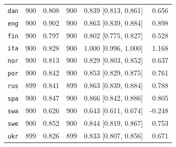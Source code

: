 \begin{table}[htbp]
\begin{minipage}[t]{0.485\linewidth}
{\begin{tabular}{@{}lrrrrr@{}}
\texttt{dan} & 900 & 0.808 & 900 & 0.839 [0.813, 0.861] & 0.656 \\
\texttt{eng} & 900 & 0.902 & 900 & 0.863 [0.839, 0.884] & 0.898 \\
\texttt{fin} & 900 & 0.797 & 900 & 0.802 [0.775, 0.827] & 0.528 \\
\texttt{ita} & 900 & 0.828 & 900 & 1.000 [0.996, 1.000] & 1.168 \\
\texttt{nor} & 900 & 0.813 & 900 & 0.829 [0.803, 0.852] & 0.637 \\
\texttt{por} & 900 & 0.842 & 900 & 0.853 [0.829, 0.875] & 0.761 \\
\texttt{rus} & 899 & 0.841 & 899 & 0.863 [0.839, 0.884] & 0.788 \\
\texttt{spa} & 900 & 0.847 & 900 & 0.866 [0.842, 0.886] & 0.805 \\
\texttt{swa} & 900 & 0.626 & 900 & 0.643 [0.611, 0.674] & -0.248 \\
\texttt{swe} & 900 & 0.852 & 900 & 0.844 [0.819, 0.867] & 0.753 \\
\texttt{ukr} & 899 & 0.826 & 899 & 0.833 [0.807, 0.856] & 0.671 \\
\bottomrule
\end{tabular}}
\end{minipage}
\end{table}

